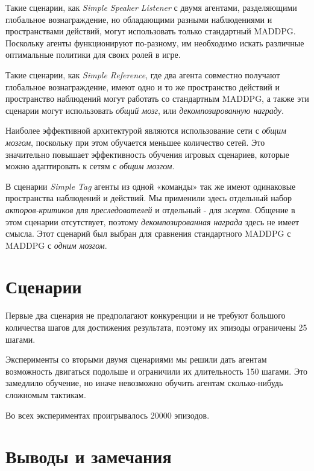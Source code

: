 Такие сценарии, как \textit{Simple Speaker Listener} с двумя агентами, разделяющими глобальное вознаграждение, но обладающими разными наблюдениями и пространствами действий, могут использовать только стандартный MADDPG. Поскольку агенты функционируют по-разному, им необходимо искать различные оптимальные политики для своих ролей в игре.

Такие сценарии, как \textit{Simple Reference}, где два агента совместно получают глобальное вознаграждение, имеют одно и то же пространство действий и пространство наблюдений могут работать со стандартным MADDPG, а также эти сценарии могут использовать \textit{общий мозг}, или \textit{декомпозированную награду}.

Наиболее эффективной архитектурой являются использование сети с \textit{общим мозгом}, поскольку при этом обучается меньшее количество сетей. Это значительно повышает эффективность обучения игровых сценариев, которые можно адаптировать к сетям с \textit{общим мозгом}.

В сценарии \textit{Simple Tag} агенты из одной «команды» так же имеют одинаковые пространства наблюдений и действий. Мы применили здесь отдельный набор \textit{акторов-критиков} для \textit{преследователей} и отдельный - для \textit{жертв}. Общение в этом сценарии отсутствует, поэтому \textit{декомпозированная награда} здесь не имеет смысла. Этот сценарий был выбран для сравнения стандартного MADDPG с MADDPG с \textit{одним мозгом}.

\newpage


\section{Сценарии}

Первые два сценария не предполагают конкуренции и не требуют большого количества шагов для достижения результата, поэтому их эпизоды ограничены 25 шагами. 

Эксперименты со вторыми двумя сценариями мы решили дать агентам возможность двигаться подольше и ограничили их длительность 150 шагами. Это замедлило обучение, но иначе невозможно обучить агентам сколько-нибудь сложномым тактикам.

Во всех экспериментах проигрывалось 20000 эпизодов.







\section{Выводы и замечания}

